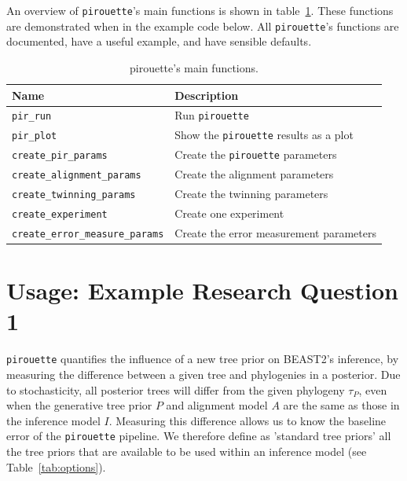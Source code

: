 \documentclass{article}
\begin{document}
An overview of \verb;pirouette;'s main functions is shown in 
table~\ref{tab:functions}. 
These functions are demonstrated when in the example code below.
All \verb;pirouette;'s functions are documented,
have a useful example, and have sensible defaults.

\begin{table}[h]
  \centering
  \begin{tabular}{ | l | l | }
    \hline
    \textbf{Name} & \textbf{Description} \\
    \hline
    \verb;pir_run; & Run \verb;pirouette; \\
    \verb;pir_plot; & Show the \verb;pirouette; results as a plot \\
    \verb;create_pir_params; & Create the \verb;pirouette; parameters \\
    \hline
    \verb;create_alignment_params; & Create the alignment parameters \\
    \verb;create_twinning_params; & Create the twinning parameters \\
    \verb;create_experiment; & Create one experiment \\
    \verb;create_error_measure_params; & Create the error measurement parameters \\
    \hline
  \end{tabular}
  \caption{pirouette's main functions.}
  \label{tab:functions}
\end{table}

\section{Usage: Example Research Question 1}

\verb;pirouette; quantifies the influence of a new tree prior on BEAST2's 
inference,
by measuring the difference between a given tree and 
phylogenies in a posterior. Due to stochasticity, all posterior trees
will differ from the given phylogeny $\tau_{\mathit{P}}$, 
even when the generative tree prior $\mathit{P}$ 
and alignment model $\mathit{A}$ are the same as 
those in the inference model $\mathit{I}$.
Measuring this difference allows us to know the baseline error
of the \verb;pirouette; pipeline. We therefore define as 'standard tree priors' 
all the tree priors that are available to be used within an inference model 
(see Table~\ref{tab:options}).
\end{document}

